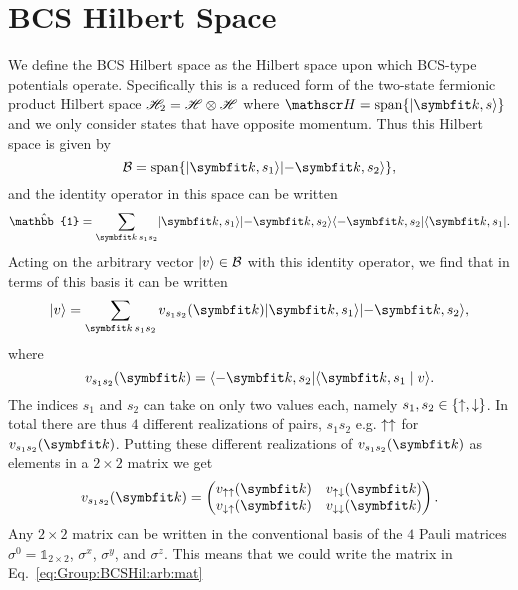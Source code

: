 \section{BCS Hilbert Space}
\label{sec:Group:BCSHil}
We define the BCS Hilbert space as the Hilbert space upon which BCS-type potentials operate. Specifically this is a reduced form of the two-state
fermionic product Hilbert space $\mathscr{H}_2 = \mathscr{H}\otimes\mathscr{H}$ where $\hil = \Span\{\ket{\v{k},s}\}$ and we only consider states that have opposite momentum.
Thus this Hilbert space is given by 
\begin{equation}
    \label{eq:Group:BCSHil:space}
    \mathcal{B} = \Span\{\ket{\v{k},s_1}\ket{-\v{k},s_2}\},
\end{equation}
and the identity operator in this space can be written
\begin{equation}
    \label{eq:Group:BCSHil:id}
    \hat{\mathbb{1}} = \sum_{\v{k}\,s_1s_2}\ket{\v{k},s_1}\ket{-\v{k},s_2}\bra{-\v{k},s_2}\bra{\v{k},s_1}.
\end{equation}
Acting on the arbitrary vector $\lvert v \rangle\in\mathcal{B}$ with this identity operator, we find that in terms of this basis it can be written
\begin{equation}
    \label{eq:Group:BCSHil:arbitrary}
    \ket{v} = \sum_{\v{k}\,s_1s_2}v_{s_1s_2}(\v{k})\ket{\v{k},s_1}\ket{-\v{k},s_2},
\end{equation}
where
\begin{equation}
    \label{eq:Group:BCSHil:arbitrary}
    v_{s_1s_2}(\v{k}) = \bra{-\v{k},s_2}\braket{\v{k},s_1}{v}.
\end{equation}
The indices $s_1$ and $s_2$ can take on only two values each, namely $s_1,s_2\in\{\uparrow,\downarrow\}$. In total there are thus $4$ different realizations
of pairs, $s_1s_2$ e.g. $\uparrow\uparrow$ for $v_{s_1s_2}(\v{k})$. Putting these different realizations of $v_{s_1s_2}(\v{k})$ as elements in a $2\times2$ matrix
we get
\begin{equation}
    \label{eq:Group:BCSHil:arb:mat}
    v_{s_1s_2}(\v{k}) =
    \begin{pmatrix}
        v_{\up\up}(\v{k}) & v_{\up\dn}(\v{k})\\
        v_{\dn\up}(\v{k}) & v_{\dn\dn}(\v{k})
    \end{pmatrix}.
\end{equation}
Any $2\times 2$ matrix can be written in the conventional basis of the $4$ Pauli matrices $\sigma^0 = \mathbb{1}_{2\times 2}$, $\sigma^x$, $\sigma^y$,
and $\sigma^z$. This means that we could write the matrix in Eq.~\eqref{eq:Group:BCSHil:arb:mat}
